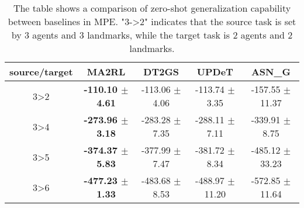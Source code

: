 \begin{table*}[ht]
    \centering
    \caption{The table shows a comparison of zero-shot generalization capability between baselines in MPE. "3->2" indicates that the source task is set by 3 agents and 3 landmarks, while the target task is 2 agents and 2 landmarks.}
    \begin{tabular}{|c|c|c|c|c|}
        \hline
        \textbf{source/target} & \textbf{MA2RL} & \textbf{DT2GS} & \textbf{UPDeT} & \textbf{ASN\_G} \\ 
        \hline
        3>2 & \textbf{-110.10 $\pm$ 4.61} & -113.06 $\pm$ 4.06 & -113.74 $\pm$ 3.35 & -157.55 $\pm$ 11.37 \\ 
        3>4 & \textbf{-273.96 $\pm$ 3.18} & -283.28 $\pm$ 7.35 & -288.11 $\pm$ 7.11 & -339.91 $\pm$ 8.75 \\ 
        3>5 & \textbf{-374.37 $\pm$ 5.83} & -377.99 $\pm$ 7.47 & -381.72 $\pm$ 8.34 & -485.12 $\pm$ 33.23 \\ 
        3>6 & \textbf{-477.23 $\pm$ 1.33} & -483.68 $\pm$ 8.53 & -488.97 $\pm$ 11.20 & -572.85 $\pm$ 11.64 \\ 
        \hline
    \end{tabular}
    \label{mpe_zeroshot1}
\end{table*}

